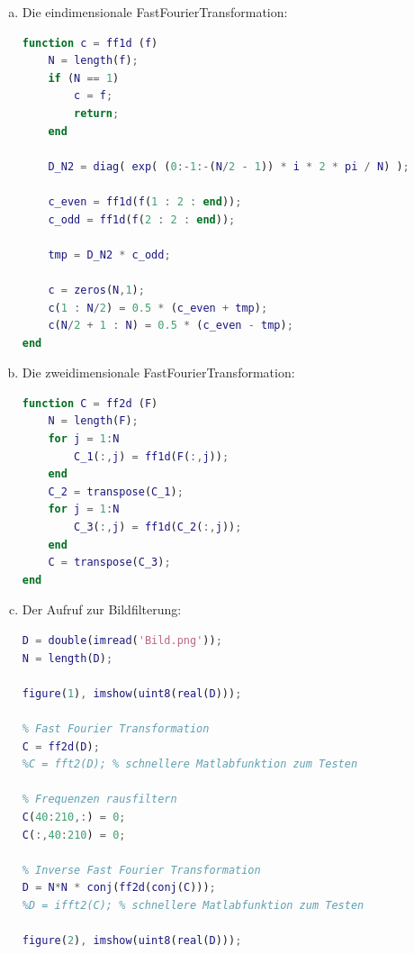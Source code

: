 \documentclass[a4paper]{scrartcl}
\begin{document}
\begin{aufgabe}
	\begin{enumerate}[a)]
		\item
			Die eindimensionale FastFourierTransformation:
			\begin{lstlisting}[language=matlab]
% Stephan Hilb, 2706616
function c = ff1d (f)
	N = length(f);
	if (N == 1)
		c = f;
		return;
	end

	D_N2 = diag( exp( (0:-1:-(N/2 - 1)) * i * 2 * pi / N) );

	c_even = ff1d(f(1 : 2 : end));
	c_odd = ff1d(f(2 : 2 : end));

	tmp = D_N2 * c_odd;

	c = zeros(N,1);
	c(1 : N/2) = 0.5 * (c_even + tmp);
	c(N/2 + 1 : N) = 0.5 * (c_even - tmp);
end
			\end{lstlisting}
		\item
			Die zweidimensionale FastFourierTransformation:
			\begin{lstlisting}[language=matlab]
% Stephan Hilb, 2706616
function C = ff2d (F)
	N = length(F);
	for j = 1:N
		C_1(:,j) = ff1d(F(:,j));
	end
	C_2 = transpose(C_1);
	for j = 1:N
		C_3(:,j) = ff1d(C_2(:,j));
	end
	C = transpose(C_3);
end
			\end{lstlisting}
		\newpage
		\item
			Der Aufruf zur Bildfilterung:
			\begin{lstlisting}[language=matlab]
% Stephan Hilb, 2706616
D = double(imread('Bild.png'));
N = length(D);

figure(1), imshow(uint8(real(D)));

% Fast Fourier Transformation
C = ff2d(D);
%C = fft2(D); % schnellere Matlabfunktion zum Testen

% Frequenzen rausfiltern
C(40:210,:) = 0;
C(:,40:210) = 0;

% Inverse Fast Fourier Transformation
D = N*N * conj(ff2d(conj(C)));
%D = ifft2(C); % schnellere Matlabfunktion zum Testen

figure(2), imshow(uint8(real(D)));
			\end{lstlisting}


\end{enumerate}
\end{aufgabe}
\end{document}
